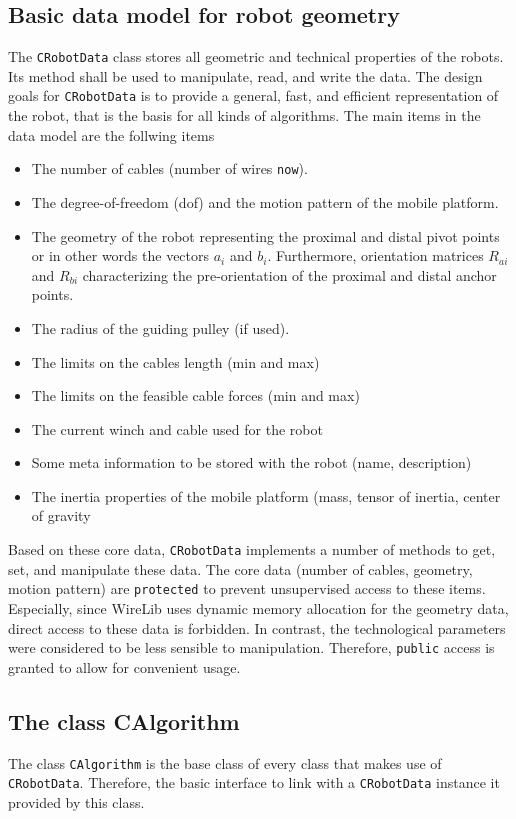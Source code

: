 \documentclass[11pt,a4paper,onepage,openany]{book}
\begin{document}
\subsection{Basic data model for robot geometry}
The \texttt{CRobotData} class stores all geometric and technical properties of
the robots. Its method shall be used to manipulate, read, and write the data.
The design goals for \texttt{CRobotData} is to provide a general, fast, and
efficient representation of the robot, that is the basis for all kinds of
algorithms. The main items in the data model are the follwing items
\begin{itemize}
  \item The number of cables (number of wires \texttt{now}).
  \item The degree-of-freedom (dof) and the motion pattern of the mobile
      platform.
  \item The geometry of the robot representing the proximal and distal pivot
      points or in other words the vectors $a_i$ and $b_i$. Furthermore,
      orientation matrices $R_{ai}$ and $R_{bi}$ characterizing the
      pre-orientation of the proximal and distal anchor points.
  \item The radius of the guiding pulley (if used).
  \item The limits on the cables length (min and max)
  \item The limits on the feasible cable forces (min and max)
  \item The current winch and cable used for the robot
  \item Some meta information to be stored with the robot (name,
      description)
  \item The inertia properties of the mobile platform (mass, tensor of
      inertia, center of gravity
\end{itemize}

Based on these core data, \texttt{CRobotData} implements a number of methods to
get, set, and manipulate these data. The core data (number of cables, geometry,
motion pattern) are \texttt{protected} to prevent unsupervised access to these
items. Especially, since WireLib uses dynamic memory allocation for the
geometry data, direct access to these data is forbidden. In contrast, the
technological parameters were considered to be less sensible to manipulation.
Therefore, \texttt{public} access is granted to allow for convenient usage.

\subsection{The class CAlgorithm}
The class \texttt{CAlgorithm} is the base class of every class that makes use
of \texttt{CRobotData}. Therefore, the basic interface to link with a
\texttt{CRobotData} instance it provided by this class.
\end{document}

